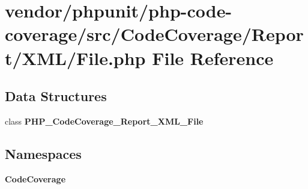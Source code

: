 \section{vendor/phpunit/php-\/code-\/coverage/src/\+Code\+Coverage/\+Report/\+X\+M\+L/\+File.php File Reference}
\label{phpunit_2php-code-coverage_2src_2_code_coverage_2_report_2_x_m_l_2_file_8php}
\subsection*{Data Structures}
\begin{DoxyCompactItemize}
\item 
class {\bf P\+H\+P\+\_\+\+Code\+Coverage\+\_\+\+Report\+\_\+\+X\+M\+L\+\_\+\+File}
\end{DoxyCompactItemize}
\subsection*{Namespaces}
\begin{DoxyCompactItemize}
\item 
 {\bf Code\+Coverage}
\end{DoxyCompactItemize}
